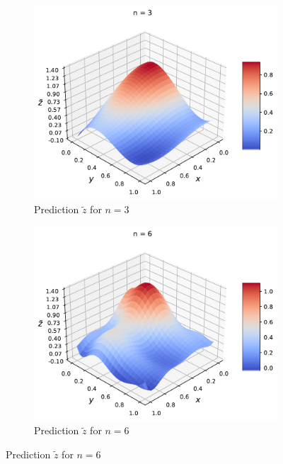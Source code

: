 \documentclass[norsk,a4paper,12pt]{scrartcl}
\begin{document}
\begin{figure}[H]
\begin{subfigure}[b]{0.49\textwidth}
     \end{subfigure}
    \begin{subfigure}[b]{0.49\textwidth}
         \centering
         \includegraphics[width=\textwidth]{figures/zprediction/n3.pdf}
         \caption{Prediction $\tilde{z}$ for $n=3$}
         \label{fig:z_n3}
     \end{subfigure}
     \hfill
     \begin{subfigure}[b]{0.49\textwidth}
         \centering
         \includegraphics[width=\textwidth]{figures/zprediction/n6.pdf}
         \caption{Prediction $\tilde{z}$ for $n=6$}
         \label{fig:z_n6}

\end{subfigure}
\end{figure}
\end{document}
